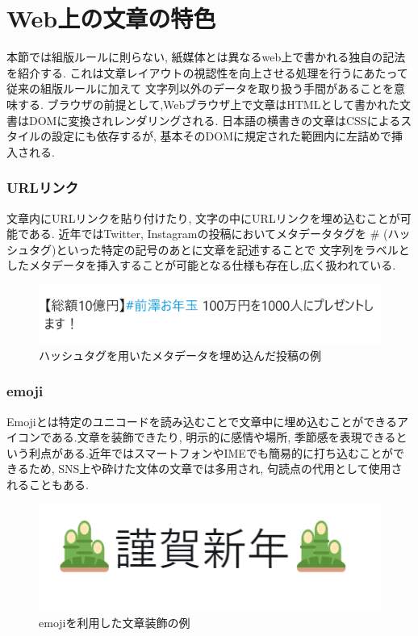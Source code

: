 \section {Web上の文章の特色}
本節では組版ルールに則らない, 紙媒体とは異なるweb上で書かれる独自の記法を紹介する.
これは文章レイアウトの視認性を向上させる処理を行うにあたって従来の組版ルールに加えて
文字列以外のデータを取り扱う手間があることを意味する.
ブラウザの前提として,Webブラウザ上で文章はHTMLとして書かれた文書はDOMに変換されレンダリングされる.
日本語の横書きの文章はCSSによるスタイルの設定にも依存するが, 基本そのDOMに規定された範囲内に左詰めで挿入される.

\subsubsection{URLリンク}
文章内にURLリンクを貼り付けたり, 文字の中にURLリンクを埋め込むことが可能である.
近年ではTwitter, Instagramの投稿においてメタデータタグを \# (ハッシュタグ)といった特定の記号のあとに文章を記述することで
文字列をラベルとしたメタデータを挿入することが可能となる仕様も存在し,広く扱われている.
\begin{figure}[H]
    \centering
    \label{fig:hush}
    \includegraphics[width=0.6\columnwidth]{image/02/img_3.png}
    \caption[ハッシュタグを用いたメタデータを埋め込んだ投稿の例]{ハッシュタグを用いたメタデータを埋め込んだ投稿の例\footnotemark[1]}
\end{figure}


\subsubsection{emoji}
Emojiとは特定のユニコードを読み込むことで文章中に埋め込むことができるアイコンである.文章を装飾できたり, 
明示的に感情や場所, 季節感を表現できるという利点がある.近年ではスマートフォンやIMEでも簡易的に打ち込むことができるため, 
SNS上や砕けた文体の文章では多用され, 句読点の代用として使用されることもある.
\begin{figure}[H]
    \centering
    \label{fig:emoji}
    \includegraphics[width=0.6\columnwidth]{image/02/img_1.png}
    \caption[emojiを利用した文章装飾の例]{emojiを利用した文章装飾の例}
\end{figure}

